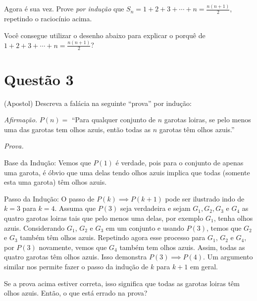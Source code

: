 \documentclass[a4paper,fleqn,12pt]{article}
\begin{document}
\n\n

Agora é sua vez. Prove \textit{por indução} que $S_n = 1 + 2 + 3 + \cdots + n = \frac{n(n+1)}{2}$, repetindo o raciocínio acima.

\n

Você consegue utilizar o desenho abaixo para explicar o porquê de $1 + 2 + 3 + \cdots + n = \frac{n(n+1)}{2}$?

\section{Questão 3}

(Apostol) Descreva a falácia na seguinte ``prova'' por indução:

\n\n

\textit{Afirmação.} $P(n) =$ ``Para qualquer conjunto de $n$ garotas loiras, se pelo menos uma das garotas tem olhos azuis, então todas as $n$ garotas têm olhos azuis.''

\n

\textit{Prova.}

Base da Indução: Vemos que $P(1)$ é verdade, pois para o conjunto de apenas uma garota, é óbvio que uma delas tendo olhos azuis implica que todas (somente esta uma garota) têm olhos azuis.

Passo da Indução: O passo de $P(k) \implies P(k+1)$ pode ser ilustrado indo de $k = 3$ para $k = 4$. Assuma que $P(3)$ seja verdadeira e sejam $G_1, G_2, G_3$ e $G_4$ as quatro garotas loiras tais que pelo menos uma delas, por exemplo $G_1$, tenha olhos azuis. Considerando $G_1$, $G_2$ e $G_3$ em um conjunto e usando $P(3)$, temos que $G_2$ e $G_3$ também têm olhos azuis. Repetindo agora esse processo para $G_1$, $G_2$ e $G_4$, por $P(3)$ novamente, vemos que $G_4$ também tem olhos azuis. Assim, todas as quatro garotas têm olhos azuis. Isso demonstra $P(3) \implies P(4)$. Um argumento similar nos permite fazer o passo da indução de $k$ para $k+1$ em geral.

\n

Se a prova acima estiver correta, isso significa que todas as garotas loiras têm olhos azuis. Então, o que está errado na prova?
\end{document}
